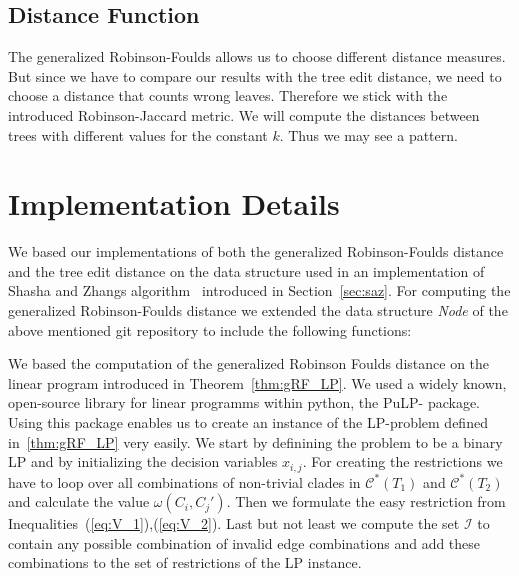 \subsection{Distance Function}
The generalized Robinson-Foulds allows us to choose different distance measures. But since we have to compare our results with the tree edit distance, we need to choose a distance that counts wrong leaves. Therefore we stick with the introduced Robinson-Jaccard metric. We will compute the distances between trees with different values for the constant $k$. Thus we may see a pattern.

\section{Implementation Details}
We based our implementations of both the generalized Robinson-Foulds distance and the tree edit distance on the data structure used in an implementation of Shasha and Zhangs algorithm~\cite{Hen} introduced in Section~\ref{sec:saz}. For computing the generalized Robinson-Foulds distance we extended the data structure \textit{Node} of the above mentioned git repository to include the following functions:

We based the computation of the generalized Robinson Foulds distance on the linear program introduced in Theorem~\ref{thm:gRF_LP}. We used a widely known, open-source library for linear programms within python, the PuLP- package. \\
Using this package enables us to create an instance of the LP-problem defined in~\ref{thm:gRF_LP} very easily. We start by definining the problem to be a binary LP and by initializing the decision variables $x_{i,j}$. For creating the restrictions we have to loop over all combinations of non-trivial clades in  $\mathcal{C}^*(T_1)$ and $\mathcal{C}^*(T_2)$ and calculate the value $\omega(C_i,C_j')$. Then we formulate the easy restriction from Inequalities~(\ref{eq:V_1}),(\ref{eq:V_2}). Last but not least we compute the set $\mathcal{I}$ to contain any possible combination of invalid edge combinations and add these combinations to the set of restrictions of the LP instance.

